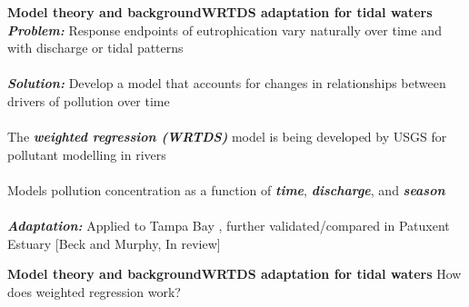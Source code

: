 \documentclass[serif]{beamer}\usepackage[]{graphicx}\usepackage[]{color}
\newcommand{\emtxt}[1]{\textbf{\textit{#1}}}
\begin{document}
\begin{frame}[t]{\textbf{Model theory and background}}{\textbf{WRTDS adaptation for tidal waters}}
\emtxt{Problem:} Response endpoints of eutrophication vary naturally over time and with discharge or tidal patterns\\~\\
\emtxt{Solution:} Develop a model that accounts for changes in relationships between drivers of pollution over time\\~\\
The \emtxt{weighted regression (WRTDS)} model is being developed by USGS for pollutant modelling in rivers \cite{Hirsch10}\\~\\
Models pollution concentration as a function of \emtxt{time}, \emtxt{discharge}, and \emtxt{season}\\~\\
\emtxt{Adaptation:} Applied to Tampa Bay \cite{Beck15}, further validated/compared in Patuxent Estuary [Beck and Murphy, In review]
\end{frame}



\begin{frame}{\textbf{Model theory and background}}{\textbf{WRTDS adaptation for tidal waters}}
How does weighted regression work?
\begin{center}
\end{center}
\end{frame}
 
\end{document}
